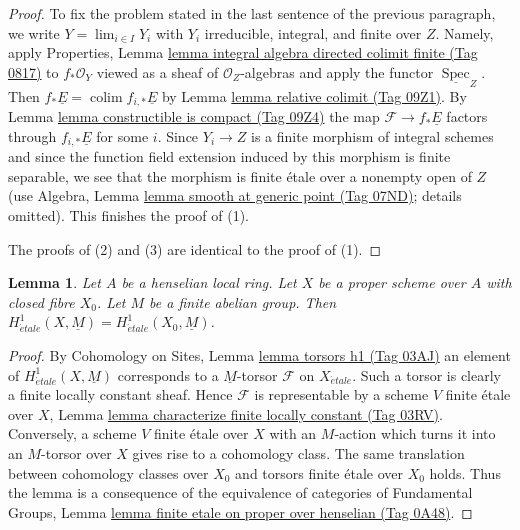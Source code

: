\documentclass{amsart}
\theoremstyle{plain}
\newtheorem{lemma}[subsection]{Lemma}
\theoremstyle{definition}
\theoremstyle{remark}
\numberwithin{equation}{subsection}
\def\lim{\mathop{\mathrm{lim}}\nolimits}
\def\colim{\mathop{\mathrm{colim}}\nolimits}
\def\Spec{\mathop{\mathrm{Spec}}}
\def\etale{{\acute{e}tale}}
\begin{document}
\begin{proof}
\medskip\noindent
To fix the problem stated in the last sentence of the previous paragraph,
we write $Y = \lim_{i \in I} Y_i$ with $Y_i$ irreducible, integral, and
finite over $Z$. Namely, apply Properties, Lemma
\href{https://stacks.math.columbia.edu/tag/0817}{lemma integral algebra directed colimit finite (Tag 0817)}
to $f_*\mathcal{O}_Y$ viewed as a sheaf of $\mathcal{O}_Z$-algebras
and apply the functor $\underline{\Spec}_Z$.
Then $f_*\underline{E} = \colim f_{i, *}\underline{E}$
by Lemma \href{https://stacks.math.columbia.edu/tag/09Z1}{lemma relative colimit (Tag 09Z1)}.
By Lemma \href{https://stacks.math.columbia.edu/tag/09Z4}{lemma constructible is compact (Tag 09Z4)} the map
$\mathcal{F} \to f_*\underline{E}$
factors through $f_{i, *}\underline{E}$ for some $i$.
Since $Y_i \to Z$ is a finite morphism of integral schemes
and since the function field extension
induced by this morphism is finite separable, we see that the
morphism is finite \'etale over a nonempty open of $Z$ (use
Algebra, Lemma \href{https://stacks.math.columbia.edu/tag/07ND}{lemma smooth at generic point (Tag 07ND)}; details omitted).
This finishes the proof of (1).

\medskip\noindent
The proofs of (2) and (3) are identical to the proof of (1).
\end{proof}


\begin{lemma}
\label{lemma-proper-over-henselian-and-h1}
Let $A$ be a henselian local ring. Let $X$ be a proper scheme over $A$
with closed fibre $X_0$. Let $M$ be a finite abelian group.
Then $H^1_\etale(X, \underline{M}) = H^1_\etale(X_0, \underline{M})$.
\end{lemma}

\begin{proof}
By Cohomology on Sites, Lemma \href{https://stacks.math.columbia.edu/tag/03AJ}{lemma torsors h1 (Tag 03AJ)}
an element of $H^1_\etale(X, \underline{M})$ corresponds to a
$\underline{M}$-torsor $\mathcal{F}$ on $X_\etale$.
Such a torsor is clearly a finite locally constant sheaf.
Hence $\mathcal{F}$ is representable by a scheme $V$ finite
\'etale over $X$, Lemma \href{https://stacks.math.columbia.edu/tag/03RV}{lemma characterize finite locally constant (Tag 03RV)}.
Conversely, a scheme $V$ finite \'etale over $X$ with an $M$-action
which turns it into an $M$-torsor over $X$ gives rise to a cohomology
class. The same translation between cohomology classes over $X_0$ and
torsors finite \'etale over $X_0$ holds. Thus the lemma
is a consequence of the equivalence of categories of
Fundamental Groups, Lemma
\href{https://stacks.math.columbia.edu/tag/0A48}{lemma finite etale on proper over henselian (Tag 0A48)}.
\end{proof}
\end{document}
